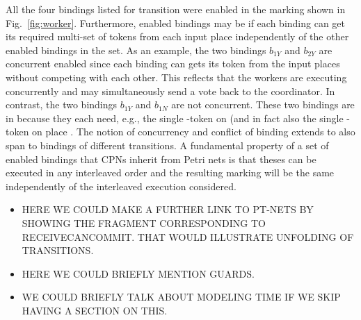 All the four bindings listed for transition 
were enabled in the marking shown in
Fig.~\ref{fig:worker}. Furthermore, enabled bindings may be
 if each binding can get its required
multi-set of tokens from each input place independently of the other
enabled bindings in the set. As an example, the two bindings $b_{1Y}$
and $b_{2Y}$ are concurrent enabled since each binding can gets its
token from the input places without competing with each other. This
reflects that the workers are executing concurrently and may
simultaneously send a vote back to the coordinator. In contrast, the two
bindings $b_{1Y}$ and $b_{1N}$ are not concurrent. These two bindings
are in  because they each need, e.g., the single
-token on  (and in fact also the single
-token on place . The notion of
concurrency and conflict of binding extends to also span to bindings
of different transitions. A fundamental property of a set of enabled
bindings that CPNs inherit from Petri nets is that theses can be
executed in any interleaved order and the resulting marking will be
the same independently of the interleaved execution considered. 

\begin{itemize}

\item HERE WE COULD MAKE A FURTHER LINK TO PT-NETS BY SHOWING THE
  FRAGMENT CORRESPONDING TO RECEIVECANCOMMIT. THAT WOULD ILLUSTRATE
  UNFOLDING OF TRANSITIONS.

\item HERE WE COULD BRIEFLY MENTION GUARDS. 

\item WE COULD BRIEFLY TALK ABOUT MODELING TIME IF WE SKIP HAVING
  A SECTION ON THIS.

\end{itemize}
